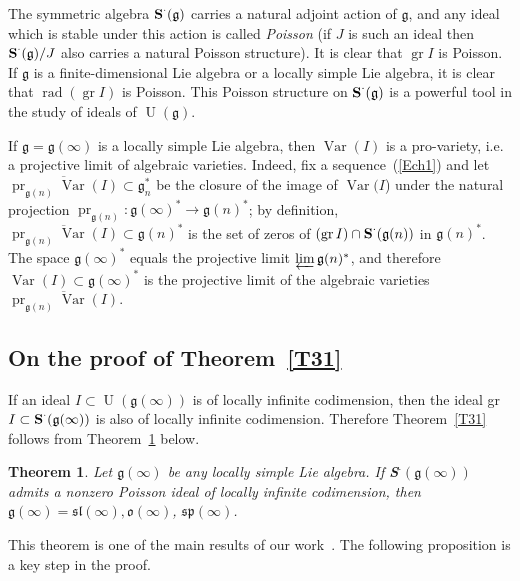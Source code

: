 \documentclass{emsprocart}
\newtheorem{theorem}{Theorem}[section]
\begin{document}
The symmetric algebra $\operatorname{\bf S}^\cdot(\mathfrak g)$ carries a natural adjoint action of $\mathfrak g$, and any ideal which is stable under this action is called {\it Poisson} (if $J$ is such an ideal then $\operatorname{\bf S}^\cdot(\mathfrak g)/J$ also carries a natural Poisson structure). It is clear that $\operatorname{gr} I$ is Poisson. If $\mathfrak g$ is a finite-dimensional Lie algebra or a locally simple Lie algebra, it is clear that $\operatorname{rad}(\operatorname{gr} I)$ is Poisson. This Poisson structure on $\operatorname{\bf S}^\cdot(\mathfrak g)$ is a powerful tool in the study of ideals of $\operatorname{U}(\mathfrak g)$.

If $\mathfrak g=\mathfrak g(\infty)$ is a locally simple Lie algebra, then $\operatorname{Var}(I)$ is a pro-variety, i.e. a projective limit of algebraic varieties. Indeed, fix a sequence~(\ref{Ech1}) and let
$\overline{\operatorname{pr}_{\mathfrak g(n)}\operatorname{Var}(I)}\subset\mathfrak g_n^*$
be the closure of the image of $\operatorname{Var}(I$) under the natural projection
$\operatorname{pr}_{\mathfrak g(n)}: \mathfrak g(\infty)^*\to\mathfrak g(n)^*$; by definition,
$\overline{\operatorname{pr}_{\mathfrak g(n)}\operatorname{Var}(I)}\subset\mathfrak g(n)^*$
is the set of zeros of $(\operatorname{gr} I)\cap\operatorname{\bf S}^\cdot(\mathfrak g(n))$ in $\mathfrak g(n)^*$. The space $\mathfrak g(\infty)^*$ equals the projective limit
$\varprojlim \mathfrak g(n)^*$, and therefore $\operatorname{Var}(I)\subset\mathfrak
g(\infty)^*$ is the projective limit of the algebraic varieties
$\overline{\operatorname{pr}_{\mathfrak g(n)}\operatorname{Var}(I)}$.

\subsection{On the proof of Theorem~\ref{T31}}\label{SSonpr} If an ideal $I\subset\operatorname{U}(\mathfrak g(\infty))$ is of locally infinite codimension, then the ideal gr$I\subset\operatorname{\bf S}^\cdot(\mathfrak g(\infty))$ is also of locally infinite codimension. Therefore Theorem~\ref{T31} follows from Theorem~\ref{Tlinf} below.
\begin{theorem}\label{Tlinf}Let $\mathfrak g(\infty)$ be any locally simple Lie algebra. If {\bf S}$^\cdot(\mathfrak g(\infty))$ admits a nonzero Poisson ideal of locally infinite codimension, then $\mathfrak g(\infty)=\mathfrak{sl}(\infty), \mathfrak o(\infty)$, $\mathfrak{sp}(\infty)$.\end{theorem}
This theorem is one of the main results of our work~\cite{PP1}. The following proposition is a key step in the proof.
\end{document}
